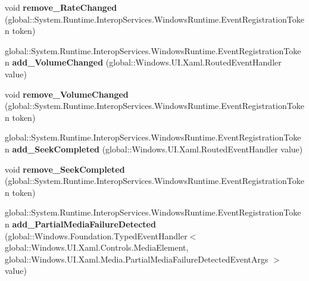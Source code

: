 \begin{DoxyCompactItemize}
\item 
\mbox{\label{class_windows_1_1_u_i_1_1_xaml_1_1_controls_1_1_media_element_a73c0ccdb24c5c0626b36b25df7adc1fc}} 
void {\bfseries remove\+\_\+\+Rate\+Changed} (global\+::\+System.\+Runtime.\+Interop\+Services.\+Windows\+Runtime.\+Event\+Registration\+Token token)
\item 
\mbox{\label{class_windows_1_1_u_i_1_1_xaml_1_1_controls_1_1_media_element_a5e1f9d35a52763afdd79bdedc9d0de22}} 
global\+::\+System.\+Runtime.\+Interop\+Services.\+Windows\+Runtime.\+Event\+Registration\+Token {\bfseries add\+\_\+\+Volume\+Changed} (global\+::\+Windows.\+U\+I.\+Xaml.\+Routed\+Event\+Handler value)
\item 
\mbox{\label{class_windows_1_1_u_i_1_1_xaml_1_1_controls_1_1_media_element_a58fbddf945f331a65f79f6c4ade4ed8c}} 
void {\bfseries remove\+\_\+\+Volume\+Changed} (global\+::\+System.\+Runtime.\+Interop\+Services.\+Windows\+Runtime.\+Event\+Registration\+Token token)
\item 
\mbox{\label{class_windows_1_1_u_i_1_1_xaml_1_1_controls_1_1_media_element_a49bafb55130b6c1789858252d474a3e9}} 
global\+::\+System.\+Runtime.\+Interop\+Services.\+Windows\+Runtime.\+Event\+Registration\+Token {\bfseries add\+\_\+\+Seek\+Completed} (global\+::\+Windows.\+U\+I.\+Xaml.\+Routed\+Event\+Handler value)
\item 
\mbox{\label{class_windows_1_1_u_i_1_1_xaml_1_1_controls_1_1_media_element_af16697e133d75536db3069f6faf2947b}} 
void {\bfseries remove\+\_\+\+Seek\+Completed} (global\+::\+System.\+Runtime.\+Interop\+Services.\+Windows\+Runtime.\+Event\+Registration\+Token token)
\item 
\mbox{\label{class_windows_1_1_u_i_1_1_xaml_1_1_controls_1_1_media_element_a400ae0b28bde4d8c18c9e3d927836d0a}} 
global\+::\+System.\+Runtime.\+Interop\+Services.\+Windows\+Runtime.\+Event\+Registration\+Token {\bfseries add\+\_\+\+Partial\+Media\+Failure\+Detected} (global\+::\+Windows.\+Foundation.\+Typed\+Event\+Handler$<$ global\+::\+Windows.\+U\+I.\+Xaml.\+Controls.\+Media\+Element, global\+::\+Windows.\+U\+I.\+Xaml.\+Media.\+Partial\+Media\+Failure\+Detected\+Event\+Args $>$ value)

\end{DoxyCompactItemize}
